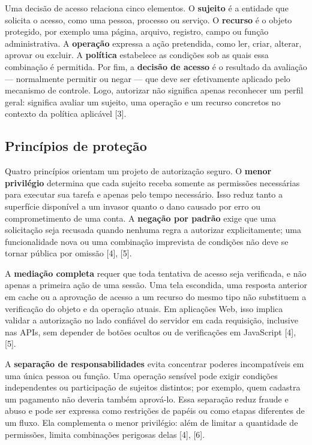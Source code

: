 Uma decisão de acesso relaciona cinco elementos. O \textbf{sujeito} é a
entidade que solicita o acesso, como uma pessoa, processo ou serviço. O
\textbf{recurso} é o objeto protegido, por exemplo uma página, arquivo,
registro, campo ou função administrativa. A \textbf{operação} expressa a
ação pretendida, como ler, criar, alterar, aprovar ou excluir. A
\textbf{política} estabelece as condições sob as quais essa combinação é
permitida. Por fim, a \textbf{decisão de acesso} é o resultado da
avaliação --- normalmente permitir ou negar --- que deve ser
efetivamente aplicado pelo mecanismo de controle. Logo, autorizar não
significa apenas reconhecer um perfil geral: significa avaliar um
sujeito, uma operação e um recurso concretos no contexto da política
aplicável {[}3{]}.

\subsection{Princípios de
proteção}\label{princuxedpios-de-proteuxe7uxe3o}

Quatro princípios orientam um projeto de autorização seguro. O
\textbf{menor privilégio} determina que cada sujeito receba somente as
permissões necessárias para executar sua tarefa e apenas pelo tempo
necessário. Isso reduz tanto a superfície disponível a um invasor quanto
o dano causado por erro ou comprometimento de uma conta. A
\textbf{negação por padrão} exige que uma solicitação seja recusada
quando nenhuma regra a autorizar explicitamente; uma funcionalidade nova
ou uma combinação imprevista de condições não deve se tornar pública por
omissão {[}4{]}, {[}5{]}.

A \textbf{mediação completa} requer que toda tentativa de acesso seja
verificada, e não apenas a primeira ação de uma sessão. Uma tela
escondida, uma resposta anterior em cache ou a aprovação de acesso a um
recurso do mesmo tipo não substituem a verificação do objeto e da
operação atuais. Em aplicações Web, isso implica validar a autorização
no lado confiável do servidor em cada requisição, inclusive nas APIs,
sem depender de botões ocultos ou de verificações em JavaScript {[}4{]},
{[}5{]}.

A \textbf{separação de responsabilidades} evita concentrar poderes
incompatíveis em uma única pessoa ou função. Uma operação sensível pode
exigir condições independentes ou participação de sujeitos distintos;
por exemplo, quem cadastra um pagamento não deveria também aprová-lo.
Essa separação reduz fraude e abuso e pode ser expressa como restrições
de papéis ou como etapas diferentes de um fluxo. Ela complementa o menor
privilégio: além de limitar a quantidade de permissões, limita
combinações perigosas delas {[}4{]}, {[}6{]}.

